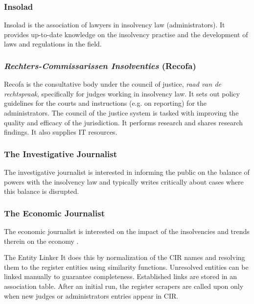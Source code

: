 \subsubsection{Insolad}
Insolad is the association of lawyers in insolvency law (administrators). It provides up-to-date knowledge on the insolvency practise and the development of laws and regulations in the field.

\subsubsection{\textit{Rechters-Commissarissen Insolventies} (Recofa)}
Recofa is the consultative body under the council of justice, \textit{raad van de rechtspraak}, specifically for judges working in insolvency law. It sets out policy guidelines for the courts and instructions (e.g. on reporting) for the administrators. The council of the justice system is tasked with improving the quality and efficacy of the jurisdiction. It performs research and shares research findings. It also supplies IT resources.

\subsubsection{The Investigative Journalist}
The investigative journalist is interested in informing the public on the balance of powers with the insolvency law and typically writes critically about cases where this balance is disrupted.

\subsubsection{The Economic Journalist}
The economic journalist is interested on the impact of the insolvencies and trends therein on the economy .



The Entity Linker
It does this by normalization of the CIR names and resolving them to the register entities using similarity functions. Unresolved entities can be linked manually to guarantee completeness. Established links are stored in an association table. After an initial run, the register scrapers are called upon only when new judges or administrators entries appear in CIR.